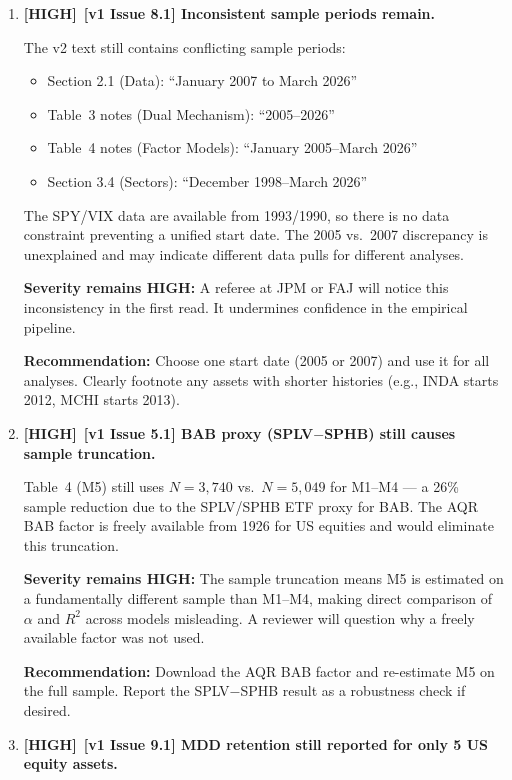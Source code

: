 \documentclass[12pt,a4paper]{article}
\newcommand{\HIGH}{\textcolor{highsev}{\textbf{[HIGH]}}}
\begin{document}
\begin{enumerate}[label=\textbf{B.\arabic*}]

\item \HIGH\ \textbf{[v1 Issue 8.1] Inconsistent sample periods remain.}

The v2 text still contains conflicting sample periods:
\begin{itemize}
\item Section 2.1 (Data): ``January 2007 to March 2026''
\item Table~3 notes (Dual Mechanism): ``2005--2026''
\item Table~4 notes (Factor Models): ``January 2005--March 2026''
\item Section 3.4 (Sectors): ``December 1998--March 2026''
\end{itemize}

The SPY/VIX data are available from 1993/1990, so there is no data constraint preventing a unified start date. The 2005 vs.\ 2007 discrepancy is unexplained and may indicate different data pulls for different analyses.

\textbf{Severity remains HIGH:} A referee at JPM or FAJ will notice this inconsistency in the first read. It undermines confidence in the empirical pipeline.

\textbf{Recommendation:} Choose one start date (2005 or 2007) and use it for all analyses. Clearly footnote any assets with shorter histories (e.g., INDA starts 2012, MCHI starts 2013).


\item \HIGH\ \textbf{[v1 Issue 5.1] BAB proxy (SPLV$-$SPHB) still causes sample truncation.}

Table~4 (M5) still uses $N = 3{,}740$ vs.\ $N = 5{,}049$ for M1--M4 --- a 26\% sample reduction due to the SPLV/SPHB ETF proxy for BAB. The AQR BAB factor is freely available from 1926 for US equities and would eliminate this truncation.

\textbf{Severity remains HIGH:} The sample truncation means M5 is estimated on a fundamentally different sample than M1--M4, making direct comparison of $\alpha$ and $R^2$ across models misleading. A reviewer will question why a freely available factor was not used.

\textbf{Recommendation:} Download the AQR BAB factor and re-estimate M5 on the full sample. Report the SPLV$-$SPHB result as a robustness check if desired.


\item \HIGH\ \textbf{[v1 Issue 9.1] MDD retention still reported for only 5 US equity assets.}


\end{enumerate}
\end{document}
